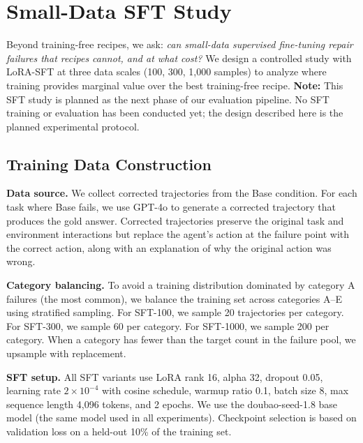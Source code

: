 \section{Small-Data SFT Study}
\label{sec:sft}

Beyond training-free recipes, we ask: \emph{can small-data supervised fine-tuning repair failures that recipes cannot, and at what cost?} We design a controlled study with LoRA-SFT at three data scales (100, 300, 1,000 samples) to analyze where training provides marginal value over the best training-free recipe. \textbf{Note:} This SFT study is planned as the next phase of our evaluation pipeline. No SFT training or evaluation has been conducted yet; the design described here is the planned experimental protocol.


\subsection{Training Data Construction}
\label{sec:sft:data}

\textbf{Data source.} We collect corrected trajectories from the Base condition. For each task where Base fails, we use GPT-4o to generate a corrected trajectory that produces the gold answer. Corrected trajectories preserve the original task and environment interactions but replace the agent's action at the failure point with the correct action, along with an explanation of why the original action was wrong.

\textbf{Category balancing.} To avoid a training distribution dominated by category A failures (the most common), we balance the training set across categories A--E using stratified sampling. For SFT-100, we sample 20 trajectories per category. For SFT-300, we sample 60 per category. For SFT-1000, we sample 200 per category. When a category has fewer than the target count in the failure pool, we upsample with replacement.

\textbf{SFT setup.} All SFT variants use LoRA rank 16, alpha 32, dropout 0.05, learning rate $2\times10^{-4}$ with cosine schedule, warmup ratio 0.1, batch size 8, max sequence length 4,096 tokens, and 2 epochs. We use the doubao-seed-1.8 base model (the same model used in all experiments). Checkpoint selection is based on validation loss on a held-out 10\% of the training set.

